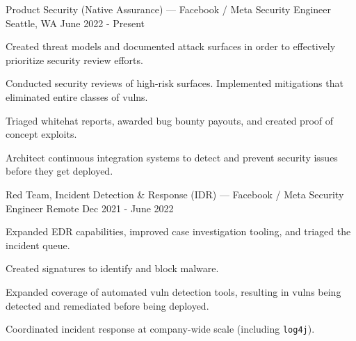 
\begin{cventries}

\cventry
{Product Security (Native Assurance) — Facebook / Meta} %
{Security Engineer} %
{Seattle, WA} %
{June 2022 - Present} %
{
	\begin{cvitems} %
		\item {Created threat models and documented attack surfaces in order to effectively prioritize security review efforts.}
		\item {Conducted security reviews of high-risk surfaces. Implemented mitigations that eliminated entire classes of vulns.}
		\item {Triaged whitehat reports,  awarded bug bounty payouts, and created proof of concept exploits.}
		\item {Architect continuous integration systems to detect and prevent security issues before they get deployed.}
	\end{cvitems}
}
\cventry
{Red Team, Incident Detection \& Response (IDR) — Facebook / Meta} %
{Security Engineer} %
{Remote} %
{Dec 2021 - June 2022} %
{
	\begin{cvitems} %
		\item {Expanded EDR capabilities, improved case investigation tooling, and triaged the incident queue.}
		\item {Created signatures to identify and block malware.}
		\item {Expanded coverage of automated vuln detection tools, resulting in vulns being detected and remediated before being deployed.}
		\item {Coordinated incident response at company-wide scale (including \texttt{log4j}).}
	\end{cvitems}
}

\end{cventries}

